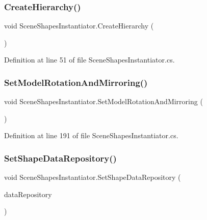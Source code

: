 \subsubsection{\texorpdfstring{CreateHierarchy()}{CreateHierarchy()}}
{\footnotesize\ttfamily void Scene\+Shapes\+Instantiator.\+Create\+Hierarchy (\begin{DoxyParamCaption}{ }\end{DoxyParamCaption})}



Definition at line 51 of file Scene\+Shapes\+Instantiator.\+cs.

\mbox{\label{class_scene_shapes_instantiator_ad5840900aadc513eb435105164c959d5}} 
\subsubsection{\texorpdfstring{SetModelRotationAndMirroring()}{SetModelRotationAndMirroring()}}
{\footnotesize\ttfamily void Scene\+Shapes\+Instantiator.\+Set\+Model\+Rotation\+And\+Mirroring (\begin{DoxyParamCaption}{ }\end{DoxyParamCaption})}



Definition at line 191 of file Scene\+Shapes\+Instantiator.\+cs.

\mbox{\label{class_scene_shapes_instantiator_a84a665ef8ad23ac0700377a8034818d0}} 
\subsubsection{\texorpdfstring{SetShapeDataRepository()}{SetShapeDataRepository()}}
{\footnotesize\ttfamily void Scene\+Shapes\+Instantiator.\+Set\+Shape\+Data\+Repository (\begin{DoxyParamCaption}\item[{\mbox{\hyperlink{class_shape_data_repository}{Shape\+Data\+Repository}}}]{data\+Repository }\end{DoxyParamCaption})}



